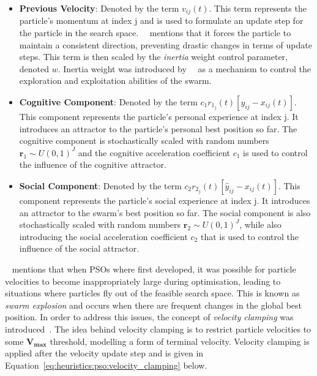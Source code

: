 \begin{itemize}
	\item \textbf{Previous Velocity}: Denoted by the term $v_{ij}(t)$. This term represents the particle's momentum at index j and is used to formulate an update step for the particle in the search space.~\citeauthor{ref:vanwyk:2014}~\cite{ref:vanwyk:2014} mentions that it forces the particle to maintain a consistent direction, preventing drastic changes in terms of update steps. This term is then scaled by the \textit{inertia} weight control parameter, denoted $w$. Inertia weight was introduced by~\citeauthor{ref:shi:1998}~\cite{ref:shi:1998} as a mechanism to control the exploration and exploitation abilities of the swarm.

	\item \textbf{Cognitive Component}: Denoted by the term $c_{1}r_{1_{j}}(t)[y_{ij} - x_{ij}(t)]$. This component represents the particle's personal experience at index j. It introduces an attractor to the particle's personal best position so far. The cognitive component is stochastically scaled with random numbers $\boldsymbol{r}_{1} \sim U(0,1)^J$ and the cognitive acceleration coefficient $c_{1}$ is used to control the influence of the cognitive attractor.

	\item \textbf{Social Component}: Denoted by the term $c_{2}r_{2_{j}}(t)[\hat{y}_{ij} - x_{ij}(t)]$. This component represents the particle's social experience at index j. It introduces an attractor to the swarm's best position so far. The social component is also stochastically scaled with random numbers $\boldsymbol{r}_{2} \sim U(0,1)^J$, while also introducing the social acceleration coefficient $c_{2}$ that is used to control the influence of the social attractor.
\end{itemize}

\citeauthor{ref:vanwyk:2014}~\cite{ref:vanwyk:2014} mentions that when \acp{PSO} where first developed, it was possible for particle velocities to become inappropriately large during optimisation, leading to situations where particles fly out of the feasible search space. This is known as \textit{swarm explosion} and occurs when there are frequent changes in the global best position. In order to address this issues, the concept of \textit{velocity clamping} was introduced~\cite{ref:eberhart:1996}. The idea behind velocity clamping is to restrict particle velocities to some $\boldsymbol{V_{max}}$ threshold, modelling a form of terminal velocity. Velocity clamping is applied after the velocity update step and is given in Equation~\eqref{eq:heuristics:pso:velocity_clamping} below.

